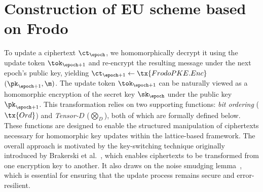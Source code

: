 \documentclass{fundam}
\begin{document}
\section{Construction of  EU scheme based on Frodo}
To update a ciphertext $\ct_{\epoch}$, we homomorphically decrypt it using the update token $\tok_{\epoch+1}$ and re-encrypt the resulting message under the next epoch’s public key, yielding $\ct_{\epoch+1} \gets \tx{FrodoPKE.Enc}$ $(\pk_{\epoch+1}, \m)$. The update token $\tok_{\epoch+1}$ can be naturally viewed as a homomorphic encryption of the secret key $\sk_{\epoch}$ under the public key $\pk_{\epoch+1}$.
%
This transformation relies on two supporting functions: \emph{bit ordering} ($\tx{Ord}$) and \emph{Tensor-$D$} ($\bigotimes_{D}$), both of which are formally defined below. These functions are designed to enable the structured manipulation of ciphertexts necessary for homomorphic key updates within the lattice-based framework.
%
The overall approach is motivated by the key-switching technique originally introduced by Brakerski et al.~\cite{brakerski2011fully, brakerski2014leveled, brakerski2014efficient}, which enables ciphertexts to be transformed from one encryption key to another. It also draws on the noise smudging lemma~\cite{asharov2012multiparty, nishimaki2022direction}, which is essential for ensuring that the update process remains secure and error-resilient.
\end{document}
